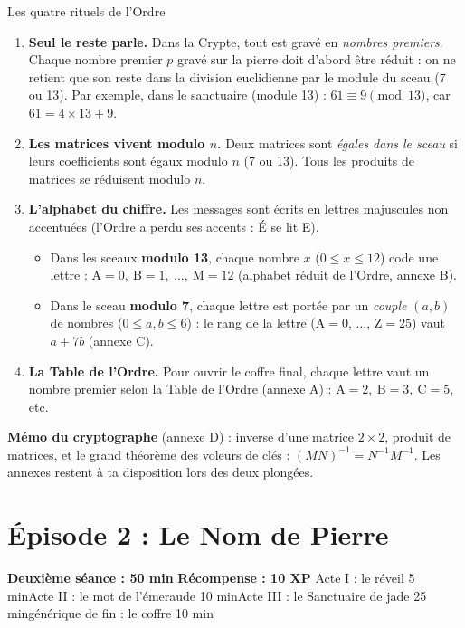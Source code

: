 \documentclass[11pt,a4paper]{article}
\begin{document}
	\begin{rituel}{Les quatre rituels de l'Ordre}
		\begin{enumerate}[label=\textbf{R\arabic*.},leftmargin=10mm]
			\item \textbf{Seul le reste parle.} Dans la Crypte, tout est gravé en
			\emph{nombres premiers}. Chaque nombre premier $p$ gravé sur la pierre
			doit d'abord être réduit : on ne retient que son reste dans la division
			euclidienne par le module du sceau (7 ou 13).
			Par exemple, dans le sanctuaire (module 13) : $61 \equiv 9 \pmod{13}$,
			car $61 = 4\times 13 + 9$.
			\item \textbf{Les matrices vivent modulo $n$.} Deux matrices sont
			\emph{égales dans le sceau} si leurs coefficients sont égaux modulo $n$
			(7 ou 13). Tous les produits de matrices se réduisent modulo $n$.
			\item \textbf{L'alphabet du chiffre.} Les messages sont écrits en lettres
			majuscules non accentuées (l'Ordre a perdu ses accents : É se lit E).
			\begin{itemize}
				\item Dans les sceaux \textbf{modulo 13}, chaque nombre $x$
				($0\leqslant x \leqslant 12$) code une lettre :
				$\text{A}=0,\ \text{B}=1,\ \dots,\ \text{M}=12$
				(alphabet réduit de l'Ordre, annexe B).
				\item Dans le sceau \textbf{modulo 7}, chaque lettre est portée par un
				\emph{couple} $(a,b)$ de nombres ($0\leqslant a,b\leqslant 6$) :
				le rang de la lettre ($\text{A}=0$, $\dots$, $\text{Z}=25$) vaut
				$a + 7b$ (annexe C).
			\end{itemize}
			\item \textbf{La Table de l'Ordre.} Pour ouvrir le coffre final, chaque lettre
			vaut un nombre premier selon la Table de l'Ordre (annexe A) :
			$\text{A}=2,\ \text{B}=3,\ \text{C}=5$, etc.
		\end{enumerate}
	\end{rituel}
	
	\begin{conseil}
		\textbf{Mémo du cryptographe} (annexe D) : inverse d'une matrice $2\times 2$,
		produit de matrices, et le grand théorème des voleurs de clés :
		$(M N)^{-1} = N^{-1} M^{-1}$. Les annexes restent à ta disposition
		lors des deux plongées.
	\end{conseil}
	
	\section*{\textcolor{nuit}{Épisode 2 : Le Nom de Pierre}}
	{\small\textbf{Deuxième séance : 50 min}\quad\textbullet\quad
		\textbf{Récompense : 10 XP}\quad\textbullet\quad
		Acte I : le réveil 5 min\quad\textbullet\quad Acte II : le mot de
		l'émeraude 10 min\quad\textbullet\quad Acte III : le Sanctuaire de jade
		25 min\quad\textbullet\quad générique de fin : le coffre 10 min}
	
\end{document}
